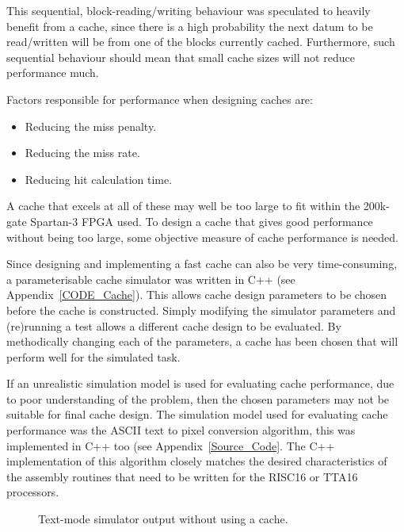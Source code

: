 This sequential, block-reading/writing behaviour was speculated to heavily
benefit from a cache, since there is a high probability the next datum to be
read/written will be from one of the blocks currently cached. Furthermore, such
sequential behaviour should mean that small cache sizes will not reduce
performance much.

Factors responsible for performance when designing caches are:
\begin{itemize}
	\item Reducing the miss penalty.
	\item Reducing the miss rate.
	\item Reducing hit calculation time.
\end{itemize}
A cache that excels at all of these may well be too large to fit within the
200k-gate Spartan-3 FPGA used. To design a cache that gives good performance
without being too large, some objective measure of cache performance is needed.

Since designing and implementing a fast cache can also be very time-consuming, a
parameterisable cache simulator was written in C++ (see
Appendix~\ref{CODE_Cache}). This allows cache design parameters to be chosen
before the cache is constructed. Simply modifying the simulator parameters and
(re)running a test allows a different cache design to be evaluated. By
methodically changing each of the parameters, a cache has been chosen that will
perform well for the simulated task.

If an unrealistic simulation model is used for evaluating cache performance, due
to poor understanding of the problem, then the chosen parameters may not be
suitable for final cache design. The simulation model used for evaluating cache
performance was the ASCII text to pixel conversion algorithm, this was
implemented in C++ too (see Appendix~\ref{Source_Code}. The C++
implementation of this algorithm closely matches the desired characteristics of
the assembly routines that need to be written for the RISC16 or TTA16 processors.


\begin{figure}[h!]
\begin{center}
\caption[Text-mode simulator without a cache]{Text-mode simulator output without
using a cache.}
\label{Mem_No_Cache}
\end{center}
\end{figure}

